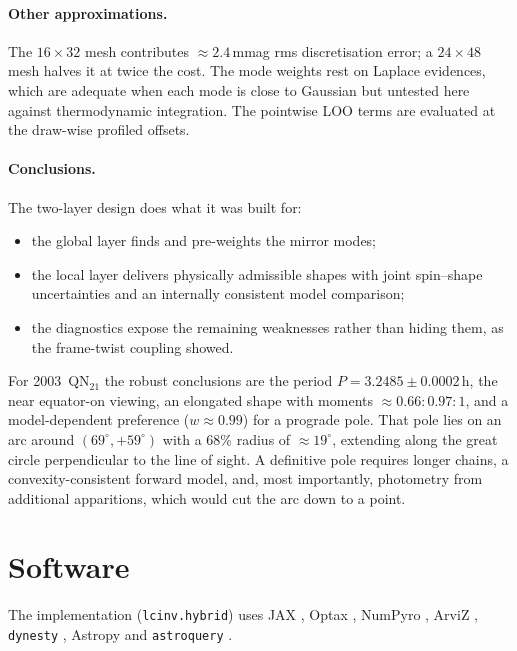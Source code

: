 \documentclass[11pt,a4paper]{article}
\theoremstyle{remark}
\begin{document}
\paragraph{Other approximations.} The $16\times32$ mesh contributes $\approx2.4$\,mmag rms
discretisation error; a $24\times48$ mesh halves it at twice the cost. The mode weights rest on Laplace
evidences, which are adequate when each mode is close to Gaussian but untested here against
thermodynamic integration. The pointwise LOO terms are evaluated at the draw-wise profiled offsets.

\paragraph{Conclusions.} The two-layer design does what it was built for:
\begin{itemize}[nosep]
\item the global layer finds and pre-weights the mirror modes;
\item the local layer delivers physically admissible shapes with joint spin--shape uncertainties and an
  internally consistent model comparison;
\item the diagnostics expose the remaining weaknesses rather than hiding them, as the frame-twist
  coupling showed.
\end{itemize}
For 2003~QN$_{21}$ the robust conclusions are the period $P=3.2485\pm0.0002$\,h, the near equator-on
viewing, an elongated shape with moments $\approx0.66:0.97:1$, and a model-dependent preference ($w\approx0.99$) for a prograde pole. That pole lies on an arc around
$(69^\circ,+59^\circ)$ with a 68\% radius of $\approx19^\circ$, extending along the great circle
perpendicular to the line of sight. A definitive pole requires longer chains, a convexity-consistent
forward model, and, most importantly, photometry from additional apparitions, which would cut the arc
down to a point.


\section*{Software}
The implementation (\texttt{lcinv.hybrid}) uses JAX \citep{jax2018}, Optax \citep{optax2020}, NumPyro
\citep{phan2019}, ArviZ \citep{kumar2019}, \texttt{dynesty} \citep{speagle2020}, Astropy
\citep{astropy2022} and \texttt{astroquery} \citep{ginsburg2019}.




\appendix
\end{document}
